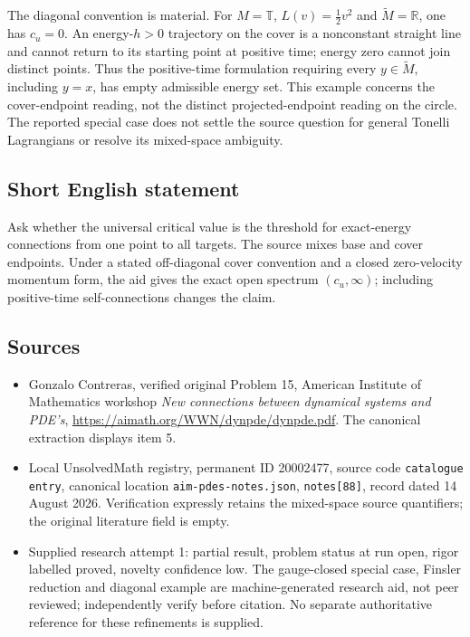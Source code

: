 \documentclass[11pt]{article}
\newcommand{\R}{\mathbb{R}}
\begin{document}
The diagonal convention is material. For $M=\mathbb T$, $L(v)=\tfrac12v^2$ and $\widetilde M=\R$, one has $c_u=0$. An energy-$h>0$ trajectory on the cover is a nonconstant straight line and cannot return to its starting point at positive time; energy zero cannot join distinct points. Thus the positive-time formulation requiring every $y\in\widetilde M$, including $y=x$, has empty admissible energy set. This example concerns the cover-endpoint reading, not the distinct projected-endpoint reading on the circle. The reported special case does not settle the source question for general Tonelli Lagrangians or resolve its mixed-space ambiguity.
\subsection{Short English statement}
Ask whether the universal critical value is the threshold for exact-energy connections from one point to all targets. The source mixes base and cover endpoints. Under a stated off-diagonal cover convention and a closed zero-velocity momentum form, the aid gives the exact open spectrum $(c_u,\infty)$; including positive-time self-connections changes the claim.
\subsection{Sources}
\begin{itemize}
\item Gonzalo Contreras, verified original Problem 15, American Institute of Mathematics workshop \emph{New connections between dynamical systems and PDE's}, \url{https://aimath.org/WWN/dynpde/dynpde.pdf}. The canonical extraction displays item 5.
\item Local UnsolvedMath registry, permanent ID 20002477, source code \texttt{catalogue entry}, canonical location \texttt{aim-pdes-notes.json}, \texttt{notes[88]}, record dated 14 August 2026. Verification expressly retains the mixed-space source quantifiers; the original literature field is empty.
\item Supplied research attempt 1: partial result, problem status at run open, rigor labelled proved, novelty confidence low. The gauge-closed special case, Finsler reduction and diagonal example are machine-generated research aid, not peer reviewed; independently verify before citation. No separate authoritative reference for these refinements is supplied.
\end{itemize}
\end{document}

